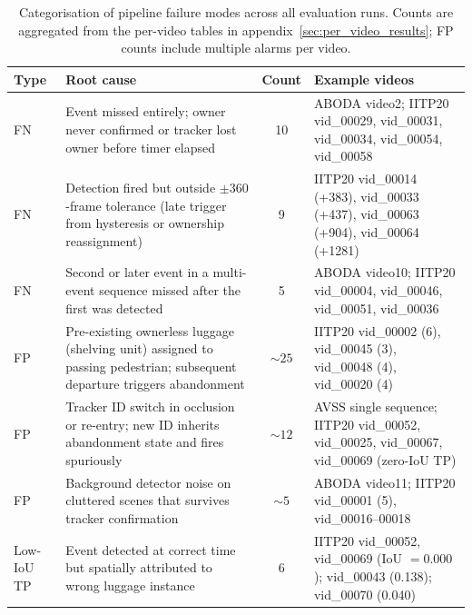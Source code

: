 \begin{table}[!htbp]
	\centering
	\small
	\begin{tabularx}{\textwidth}{@{\extracolsep{\fill}}l >{\raggedright\arraybackslash}X c >{\raggedright\arraybackslash}X}
		\toprule
		\textbf{Type} & \textbf{Root cause}                                                                                                      & \textbf{Count} & \textbf{Example videos}                                                                   \\
		\midrule
		FN            & Event missed entirely; owner never confirmed or tracker lost owner before timer elapsed                                  & 10             & ABODA video2; IITP20 vid\_00029, vid\_00031, vid\_00034, vid\_00054, vid\_00058           \\
		FN            & Detection fired but outside $\pm 360$-frame tolerance (late trigger from hysteresis or ownership reassignment)           & 9              & IITP20 vid\_00014 (+383), vid\_00033 (+437), vid\_00063 (+904), vid\_00064 (+1281)        \\
		FN            & Second or later event in a multi-event sequence missed after the first was detected                                      & 5              & ABODA video10; IITP20 vid\_00004, vid\_00046, vid\_00051, vid\_00036                      \\
		\midrule
		FP            & Pre-existing ownerless luggage (shelving unit) assigned to passing pedestrian; subsequent departure triggers abandonment & $\sim 25$      & IITP20 vid\_00002 (6), vid\_00045 (3), vid\_00048 (4), vid\_00020 (4)                     \\
		FP            & Tracker ID switch in occlusion or re-entry; new ID inherits abandonment state and fires spuriously                       & $\sim 12$      & AVSS single sequence; IITP20 vid\_00052, vid\_00025, vid\_00067, vid\_00069 (zero-IoU TP) \\
		FP            & Background detector noise on cluttered scenes that survives tracker confirmation                                         & $\sim 5$       & ABODA video11; IITP20 vid\_00001 (5), vid\_00016--00018                                   \\
		\midrule
		Low-IoU TP    & Event detected at correct time but spatially attributed to wrong luggage instance                                        & 6              & IITP20 vid\_00052, vid\_00069 (IoU $=0.000$); vid\_00043 (0.138); vid\_00070 (0.040)      \\
		\bottomrule
	\end{tabularx}
	\caption{Categorisation of pipeline failure modes across all evaluation runs. Counts are aggregated from the per-video tables in appendix~\ref{sec:per_video_results}; FP counts include multiple alarms per video.}
	\label{tab:failure_modes}
\end{table}

